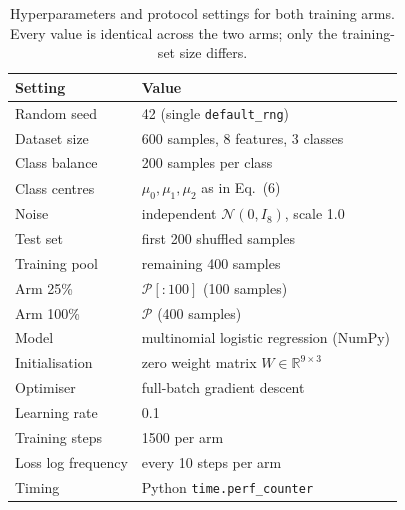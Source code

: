 \documentclass{article}
\begin{document}
\begin{table}[h]
\centering
\caption{Hyperparameters and protocol settings for both training arms. Every value is identical across the two arms; only the training-set size differs.}
\label{tab:hyperparams}
\begin{tabular}{ll}
\toprule
\textbf{Setting} & \textbf{Value} \\
\midrule
Random seed & 42 (single \texttt{default\_rng}) \\
Dataset size & 600 samples, 8 features, 3 classes \\
Class balance & 200 samples per class \\
Class centres & \(\mu_0, \mu_1, \mu_2\) as in Eq.~(6) \\
Noise & independent \(\mathcal{N}(0, I_8)\), scale 1.0 \\
Test set & first 200 shuffled samples \\
Training pool & remaining 400 samples \\
Arm 25\% & \(\mathcal{P}[:100]\) (100 samples) \\
Arm 100\% & \(\mathcal{P}\) (400 samples) \\
Model & multinomial logistic regression (NumPy) \\
Initialisation & zero weight matrix \(W \in \mathbb{R}^{9 \times 3}\) \\
Optimiser & full-batch gradient descent \\
Learning rate & 0.1 \\
Training steps & 1500 per arm \\
Loss log frequency & every 10 steps per arm \\
Timing & Python \texttt{time.perf\_counter} \\
\bottomrule
\end{tabular}
\end{table}
\end{document}
